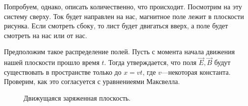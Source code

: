 \documentclass[11pt,a4paper]{article}
\numberwithin{equation}{section}
\begin{document}
Попробуем, однако, описать количественно, что происходит. Посмотрим на
эту систему сверху. Ток будет направлен на нас, магнитное поле лежит
в плоскости рисунка. Если смотреть сбоку, то лист будет двигаться
вверх, а поле будет смотреть на нас или от нас. 

Предположим такое распределение полей. Пусть с момента начала движения
нашей плоскости прошло время $t$. Тогда утверждается, что поля
$\vec{E}, \vec{B}$ будут существовать в пространстве только до
$x=vt$, где $v$---некоторая константа. Проверим, как это согласуется с
уравнениеями Максвелла. 

\begin{figure}[h]
  \centering
  \hspace{2cm}
  \caption{Движущаяся заряженная плоскость.}
  \label{fig:moving_plate}
\end{figure}
\end{document}
